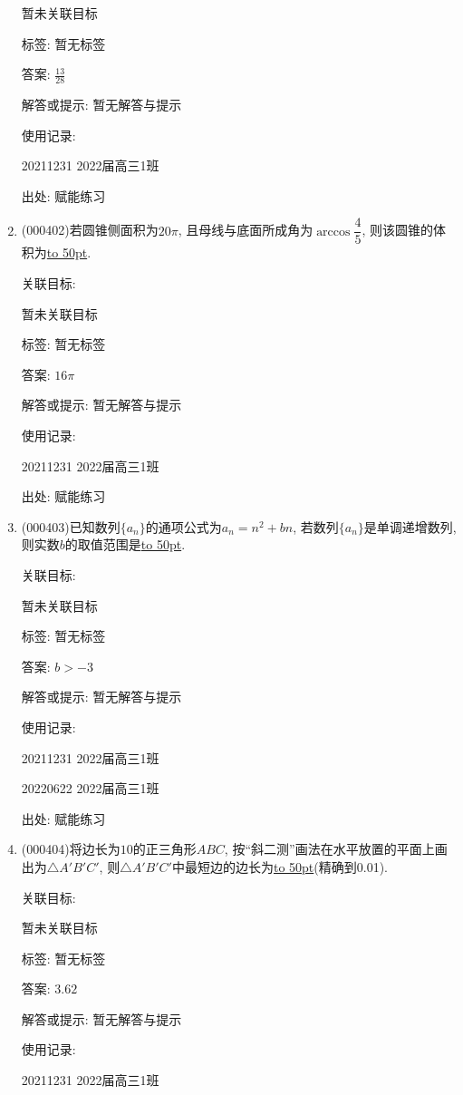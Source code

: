 \documentclass[10pt,a4paper]{article}
\newcommand{\blank}[1]{\underline{\hbox to #1pt{}}}
\begin{document}
\begin{enumerate}[1.]
暂未关联目标



标签: 暂无标签

答案: $\frac{13}{28}$

解答或提示: 暂无解答与提示

使用记录:

20211231	2022届高三1班	


出处: 赋能练习
\item { (000402)}若圆锥侧面积为$20\pi$, 且母线与底面所成角为$\arccos \dfrac45$, 则该圆锥的体积为\blank{50}.


关联目标:

暂未关联目标



标签: 暂无标签

答案: $16\pi$

解答或提示: 暂无解答与提示

使用记录:

20211231	2022届高三1班	


出处: 赋能练习
\item { (000403)}已知数列$\{a_n\}$的通项公式为$a_n=n^2+bn$, 若数列$\{a_n\}$是单调递增数列, 则实数$b$的取值范围是\blank{50}.


关联目标:

暂未关联目标



标签: 暂无标签

答案: $b>-3$

解答或提示: 暂无解答与提示

使用记录:

20211231	2022届高三1班	

20220622	2022届高三1班  	


出处: 赋能练习
\item { (000404)}将边长为$10$的正三角形$ABC$, 按``斜二测''画法在水平放置的平面上画出为$\triangle A'B'C'$, 则$\triangle A'B'C'$中最短边的边长为\blank{50}(精确到0.01).


关联目标:

暂未关联目标



标签: 暂无标签

答案: $3.62$

解答或提示: 暂无解答与提示

使用记录:

20211231	2022届高三1班	



\end{enumerate}
\end{document}
